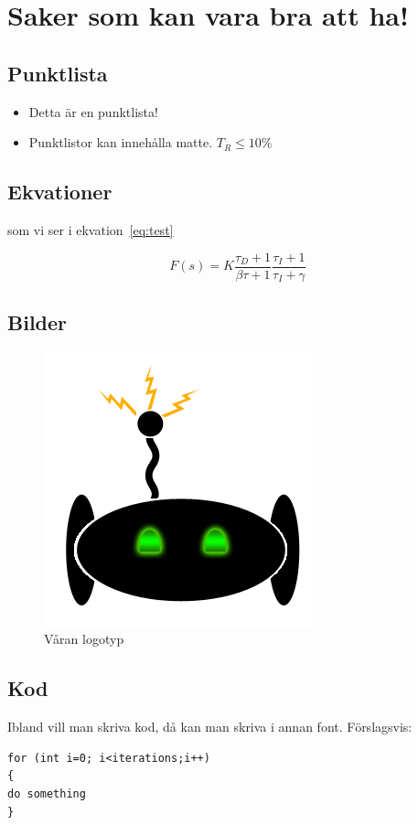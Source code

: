 \documentclass[a4paper,12pt,fleqn]{article}
\begin{document}
	
\tableofcontents
\thispagestyle{fancy}
\newpage

\section{Saker som kan vara bra att ha!}

\subsection{Punktlista}
\begin{itemize}
  \item Detta är en punktlista! 
  \item Punktlistor kan innehålla matte. $T_R \leq 10\%$
\end{itemize}

\subsection{Ekvationer}

som vi ser i ekvation~\ref{eq:test} %

\begin{equation}
F(s)= K\frac{\tau_D+1}{\beta\tau+1}\frac{\tau_I+1}{\tau_I+\gamma}	
	\label{eq:test} %
\end{equation} 

\subsection{Bilder}


\begin{figure}[htp] %
  \begin{center}
  \includegraphics[keepaspectratio=true,scale=0.8]{logotyp}  %
  \end{center}
  \caption{Våran logotyp} %
\end{figure}

\subsection{Kod}
Ibland vill man skriva kod, då kan man skriva i annan font. Förslagsvis:
\\ %

\begin{lstlisting}
for (int i=0; i<iterations;i++)
{
do something
}
\end{lstlisting}
\end{document}

